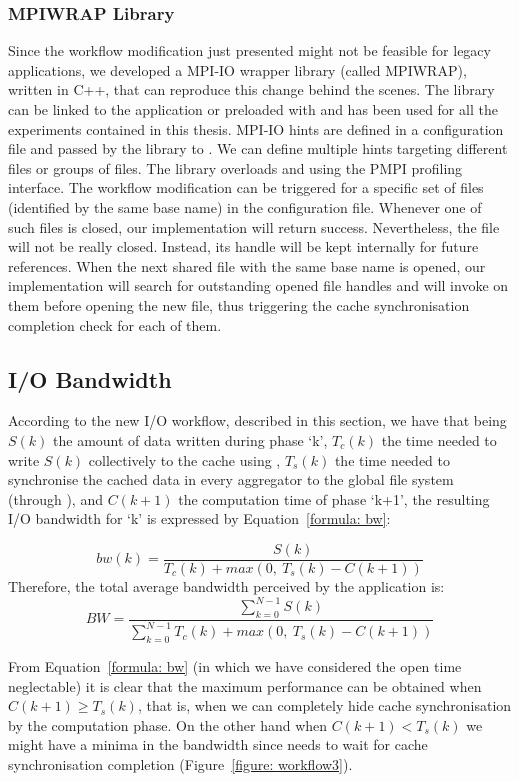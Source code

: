 \subsubsection{MPIWRAP Library}
\label{subsubsec: mpiwrap}
Since the workflow modification just presented might not be feasible for legacy applications, we developed a MPI-IO wrapper library (called MPIWRAP), written in C++, that can reproduce this change behind the scenes. The library can be linked to the application or preloaded with  and has been used for all the experiments contained in this thesis. MPI-IO hints are defined in a configuration file and passed by the library to . We can define multiple hints targeting different files or groups of files. The library overloads  and  using the PMPI profiling interface. The workflow modification can be triggered for a specific set of files (identified by the same base name) in the configuration file. Whenever one of such files is closed, our  implementation will return success. Nevertheless, the file will not be really closed. Instead, its handle will be kept internally for future references. When the next shared file with the same base name is opened, our  implementation will search for outstanding opened file handles and will invoke  on them before opening the new file, thus triggering the cache synchronisation completion check for each of them.

\subsection{I/O Bandwidth}
\label{subsec: bw-impr}
According to the new I/O workflow, described in this section, we have that being $S(k)$ the amount of data written during phase `k', $T_c(k)$ the time needed to write $S(k)$ collectively to the cache using , $T_s(k)$ the time needed to synchronise the cached data in every aggregator to the global file system (through ), and $C(k+1)$ the computation time of phase `k+1', the resulting I/O bandwidth for `k' is expressed by Equation~\ref{formula: bw}:

\begin{equation}\label{formula: bw}
        bw(k) = \frac{S(k)}{T_c(k) + max(0,\ T_s(k) - C(k+1))}
\end{equation}
Therefore, the total average bandwidth perceived by the application is:
\begin{equation}\label{formula: abw}
        BW = \frac{\sum_{k=0}^{N-1} S(k)}{\sum_{k=0}^{N-1} T_c(k) + max(0,\ T_s(k) - C(k+1))}
\end{equation}

From Equation~\ref{formula: bw} (in which we have considered the open time neglectable) it is clear that the maximum performance can be obtained when $C(k+1) \geq T_s(k)$, that is, when we can completely hide cache synchronisation by the computation phase. On the other hand when $C(k+1) < T_s(k)$ we might have a minima in the bandwidth since  needs to wait for cache synchronisation completion (Figure~\ref{figure: workflow3}). 
